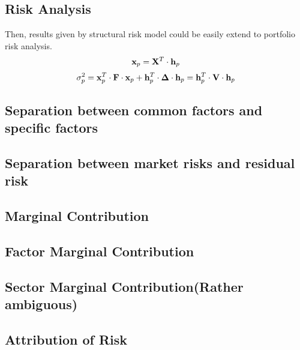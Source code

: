 \documentclass[fontsize=11pt, %
                             paper=a4, %
                             twoside, %
                             captions=tableheading,
                             index=totoc,
                             hyperref]{labbook}
\begin{document}
\begin{addmargin}[4cm]{0cm}
\section{Risk Analysis}
Then, results given by structural risk model could be easily extend to portfolio risk analysis. 
\begin{equation}
\mathbf{x}_p=\mathbf{X}^T\cdot \mathbf{h}_p
\end{equation}
\begin{equation}
\sigma^2_p=\mathbf{x}_p^T\cdot \mathbf{F} \cdot \mathbf{x}_p +\mathbf{h}_p^T\cdot \mbox{\boldmath$ \Delta $} \cdot \mathbf{h}_p=\mathbf{h}_p^T\cdot \mathbf{V} \cdot \mathbf{h}_p
\end{equation}
\subsection{Separation between common factors and specific factors}
\subsection{Separation between market risks and residual risk}
\subsection{Marginal Contribution}
\subsection{Factor Marginal Contribution}
\subsection{Sector Marginal Contribution(Rather ambiguous)}
\subsection{Attribution of Risk}





\end{addmargin}
\end{document}
